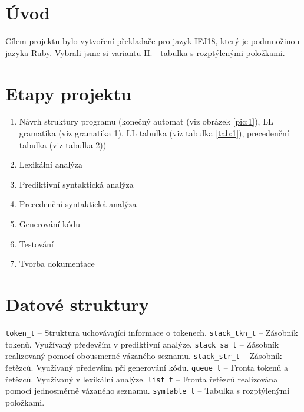 \documentclass[11pt, a4paper]{article}
\begin{document}
\section{Úvod}
Cílem projektu bylo vytvoření překladače pro jazyk IFJ18, který je podmnožinou jazyka Ruby. Vybrali jsme si variantu II. - tabulka s rozptýlenými položkami.

\section{Etapy projektu}
\begin{enumerate}
  \item Návrh struktury programu (konečný automat (viz obrázek \ref{pic:1}), LL gramatika (viz gramatika 1), LL tabulka (viz tabulka \ref{tab:1}), precedenční tabulka (viz tabulka 2))
  \vspace{-0.6em}
  \item Lexikální analýza
  \vspace{-0.6em}
  \item Prediktivní syntaktická analýza 
  \vspace{-0.6em}
  \item Precedenční syntaktická analýza 
  \vspace{-0.6em}
  \item Generování kódu
  \vspace{-0.6em}
  \item Testování
  \vspace{-0.6em}
  \item Tvorba dokumentace
  \vspace{-0.6em}
\end{enumerate}


\section{Datové struktury}
\noindent
\verb|token_t| -- Struktura uchovávající informace o tokenech. \newline
\verb|stack_tkn_t| -- Zásobník tokenů. Využívaný především v prediktivní analýze. \newline
\verb|stack_sa_t| -- Zásobník realizovaný pomocí obousmerně vázaného seznamu. \newline
\verb|stack_str_t| -- Zásobník řetězců. Využívaný především při generování kódu. \newline
\verb|queue_t| -- Fronta tokenů a řetězců. Využívaný v lexikální analýze.\newline
\verb|list_t| -- Fronta řetězců realizována pomocí jednosměrně vázaného seznamu.\newline
\verb|symtable_t| -- Tabulka s rozptýlenými položkami.\newline
\end{document}
